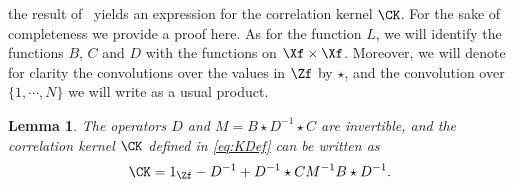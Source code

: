 \documentclass[]{pcmi}
\theoremstyle{plain}
\newtheorem{lemma}[equation]{Lemma}
\theoremstyle{definition}
\begin{document}
the result of~\cite[Lem.~1.5]{borodinRains} yields an expression for the correlation kernel $\CK$. For the sake of completeness we provide a proof here. As for the function $L$, we will identify the functions $B$, $C$ and $D$ with the functions on $\Xf \times \Xf$. Moreover, we will denote for clarity the convolutions over the values in $\Zf$ by $\star$, and the convolution over $\{1, \cdots, N\}$ we will write as a usual product.

\begin{lemma}
 The operators $D$ and $M=B \star D^{-1} \star C$ are invertible, and the correlation kernel $\CK$ defined in \eqref{eq:KDef} can be written as
\begin{equation}\label{eq:KAfterInversion}
\CK= 1_\Zf - D^{-1} + D^{-1} \star C M^{-1} B \star D^{-1}.
\end{equation}
\end{lemma}
\end{document}
